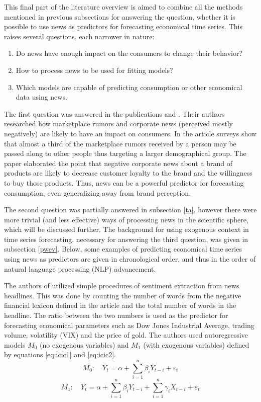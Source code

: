 \documentclass[13pt, a4paper]{article}
\begin{document}
This final part of the literature overview is aimed to combine all the methods mentioned in previous subsections for answering the question, whether it is possible to use news as predictors for forecasting economical time series. This raises several questions, each narrower in nature:
\begin{enumerate}
	\item Do news have enough impact on the consumers to change their behavior?
	\item How to process news to be used for fitting models?
	\item Which models are capable of predicting consumption or other economical data using news.
\end{enumerate}
The first question was answered in the publications \cite{kamins1997consumer} and \cite{sago2014impact}. Their authors researched how marketplace rumors and corporate news (perceived mostly negatively) are likely to have an impact on consumers. In the article \cite{kamins1997consumer} surveys show that almost a third of the marketplace rumors received by a person may be passed along to other people thus targeting a larger demographical group. The paper \cite{sago2014impact} elaborated the point that negative corporate news about a brand of products are likely to decrease customer loyalty to the brand and the willingness to buy those products. Thus, news can be a powerful predictor for forecasting consumption, even generalizing away from brand perception.

The second question was partially answered in subsection \ref{ta}, however there were more trivial (and less effective) ways of processing news in the scientific sphere, which will be discussed further. The background for using exogenous context in time series forecasting, necessary for answering the third question, was given in subsection \ref{pwev}. Below, some examples of predicting economical time series using news as predictors are given in chronological order, and thus in the order of natural language processing (NLP) advancement.

The authors of \cite{mao2011predicting} utilized simple procedures of sentiment extraction from news headlines. This was done by counting the number of words from the negative financial lexicon defined in the article \cite{loughran2011liability} and the total number of words in the headline. The ratio between the two numbers is used as the predictor for forecasting economical parameters such as Dow Jones Industrial Average, trading volume, volatility (VIX) and the price of gold. The authors used autoregressive models $M_0$ (no exogenous variables) and $M_1$ (with exogenous variables) defined by equations \ref{eq:icic1} and \ref{eq:icic2}.
\begin{equation} \label{eq:icic1}
M_0: \quad Y_t = \alpha + \sum_{i=1}^n \beta_i Y_{t-i} + \varepsilon_t
\end{equation}
\begin{equation} \label{eq:icic2}
M_1: \quad Y_t = \alpha + \sum_{i=1}^n \beta_i Y_{t-i} + \sum_{i=1}^n \gamma_i X_{t-i} + \varepsilon_t
\end{equation}
\end{document}
